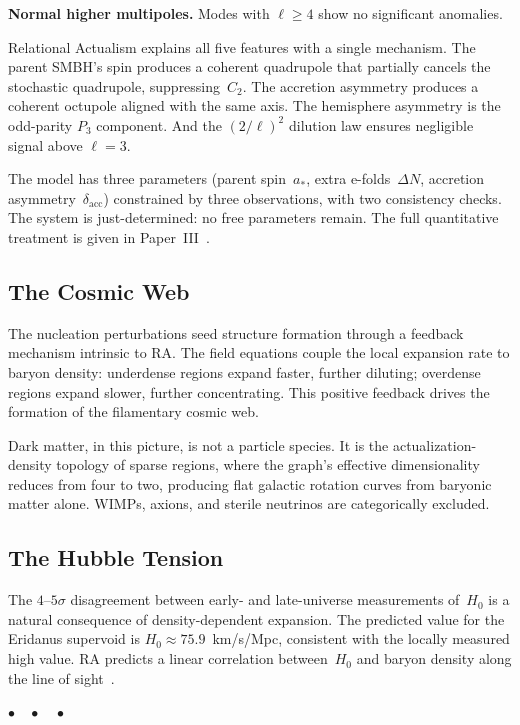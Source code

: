 \documentclass[12pt,a4paper]{article}
\begin{document}
\textbf{Normal higher multipoles.} Modes with $\ell \geq 4$ show no significant anomalies.

Relational Actualism explains all five features with a single mechanism. The parent SMBH's spin produces a coherent quadrupole that partially cancels the stochastic quadrupole, suppressing~$C_2$. The accretion asymmetry produces a coherent octupole aligned with the same axis. The hemisphere asymmetry is the odd-parity $P_3$ component. And the $(2/\ell)^2$ dilution law ensures negligible signal above $\ell=3$.

The model has three parameters (parent spin~$a_*$, extra e-folds~$\Delta N$, accretion asymmetry~$\delta_{\mathrm{acc}}$) constrained by three observations, with two consistency checks. The system is just-determined: no free parameters remain. The full quantitative treatment is given in Paper~III~\cite{P3}.

\subsection{The Cosmic Web}

The nucleation perturbations seed structure formation through a feedback mechanism intrinsic to RA. The field equations couple the local expansion rate to baryon density: underdense regions expand faster, further diluting; overdense regions expand slower, further concentrating. This positive feedback drives the formation of the filamentary cosmic web.

Dark matter, in this picture, is not a particle species. It is the actualization-density topology of sparse regions, where the graph's effective dimensionality reduces from four to two, producing flat galactic rotation curves from baryonic matter alone. WIMPs, axions, and sterile neutrinos are categorically excluded.

\subsection{The Hubble Tension}

The $4$--$5\sigma$ disagreement between early- and late-universe measurements of~$H_0$ is a natural consequence of density-dependent expansion. The predicted value for the Eridanus supervoid is $H_0 \approx 75.9$~km/s/Mpc, consistent with the locally measured high value. RA predicts a linear correlation between~$H_0$ and baryon density along the line of sight~\cite{P3}.

\bigskip\begin{center}$\bullet\quad\bullet\quad\bullet$\end{center}\bigskip
\end{document}
